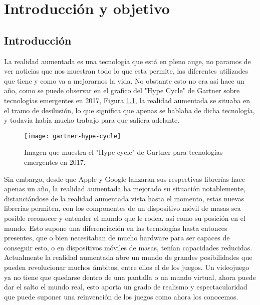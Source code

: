 \chapter{Introducción y objetivo}
\label{ch:introduccion}

\section{Introducción}
La realidad aumentada es una tecnología que está en pleno auge, no paramos de ver noticias que nos muestran todo lo que esta permite, las diferentes utilizades que tiene y como va a mejorarnos la vida. No obstante esto no era así hace un año, como se puede observar en el grafico del "Hype Cycle" de Gartner sobre tecnologías emergentes en 2017, Figura \ref{figura-gartner}, la realidad aumentada se situaba en el tramo de desilusión, lo que significa que apenas se hablaba de dicha tecnología, y todavía habia mucho trabajo para que saliera adelante.\\

\begin{figure}[h]
  \centering
  \texttt{[image: gartner-hype-cycle]}
  \caption{Imagen que muestra el "Hype cycle" de Gartner para tecnologías emergentes en 2017.\protect\footnotemark}
  \label{figura-gartner}
\end{figure}


Sin embargo, desde que Apple y Google lanzaran sus respectivas librerías hace apenas un año, la realidad aumentada ha mejorado su situación notablemente, distanciándose de la realidad aumentada vista hasta el momento, estas nuevas librerias permiten, con los componentes de un dispositivo móvil de masas sea posible reconocer y entender el mundo que le rodea, así como su posición en el mundo. Esto supone una diferenciación en las tecnologías hasta entonces presentes, que o bien necesitaban de mucho hardware para ser capaces de conseguir esto, o en dispositivos móviles de masas, tenían capacidades reducidas.\\

Actualmente la realidad aumentada abre un mundo de grandes posibilidades que pueden revolucionar muchos ámbitos, entre ellos el de los juegos. Un videojuego ya no tiene que quedarse dentro de una pantalla o un mundo virtual, ahora puede dar el salto el mundo real, esto aporta un grado de realismo y espectacularidad que puede suponer una reinvención de los juegos como ahora los conocemos.\\

